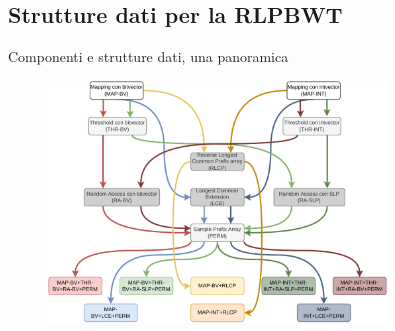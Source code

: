 \documentclass[]{beamer}
\def\RLCP{\mbox{\rm {\sf RLCP}}}
\def\MS{\mbox{\rm {\sf MS}}}
\def\SMEM{\mbox{\rm {\sf SMEM}}}
\begin{document}
\subsection{Strutture dati per la RLPBWT}
\begin{frame}{Componenti e strutture dati, una panoramica}
  \begin{figure}[H]
    \centering
    \includegraphics[width=0.8\textwidth]{img/ds.pdf}
  \end{figure}
\end{frame}
\end{document}

